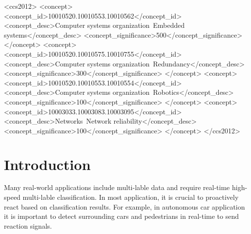 \documentclass[sigconf]{acmart}
\begin{document}
%
%
\begin{CCSXML}
<ccs2012>
 <concept>
  <concept_id>10010520.10010553.10010562</concept_id>
  <concept_desc>Computer systems organization~Embedded systems</concept_desc>
  <concept_significance>500</concept_significance>
 </concept>
 <concept>
  <concept_id>10010520.10010575.10010755</concept_id>
  <concept_desc>Computer systems organization~Redundancy</concept_desc>
  <concept_significance>300</concept_significance>
 </concept>
 <concept>
  <concept_id>10010520.10010553.10010554</concept_id>
  <concept_desc>Computer systems organization~Robotics</concept_desc>
  <concept_significance>100</concept_significance>
 </concept>
 <concept>
  <concept_id>10003033.10003083.10003095</concept_id>
  <concept_desc>Networks~Network reliability</concept_desc>
  <concept_significance>100</concept_significance>
 </concept>
</ccs2012>
\end{CCSXML}


%



%
\maketitle

\section{Introduction}
Many real-world applications include multi-lable data and require real-time high-speed multi-lable classification. In most application, it is crucial to proactively react based on classification results. For example, in autonomous car application it is important to detect surrounding cars and pedestrians in real-time to send reaction signals. 














\end{document}
